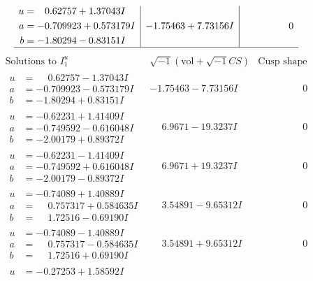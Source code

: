 \documentclass[1p]{elsarticle_modified}
\theoremstyle{definition}
\newcommand{\I}{\sqrt{-1}}
\begin{document}
$$\begin{array}{c|c|c}
\begin{aligned}
u &= \phantom{-}0.62757 + 1.37043 I \\
a &= -0.709923 + 0.573179 I \\
b &= -1.80294 - 0.83151 I\end{aligned}
 & -1.75463 + 7.73156 I & \phantom{-0.000000 } 0\\
 \hline 
 \end{array}$$\newpage$$\begin{array}{c|c|c}  
\text{Solutions to }I^u_{1}& \I (\text{vol} + \sqrt{-1}CS) & \text{Cusp shape}\\
 \hline 
\begin{aligned}
u &= \phantom{-}0.62757 - 1.37043 I \\
a &= -0.709923 - 0.573179 I \\
b &= -1.80294 + 0.83151 I\end{aligned}
 & -1.75463 - 7.73156 I & \phantom{-0.000000 } 0 \\ \hline\begin{aligned}
u &= -0.62231 + 1.41409 I \\
a &= -0.749592 - 0.616048 I \\
b &= -2.00179 + 0.89372 I\end{aligned}
 & \phantom{-}6.9671 - 19.3237 I & \phantom{-0.000000 } 0 \\ \hline\begin{aligned}
u &= -0.62231 - 1.41409 I \\
a &= -0.749592 + 0.616048 I \\
b &= -2.00179 - 0.89372 I\end{aligned}
 & \phantom{-}6.9671 + 19.3237 I & \phantom{-0.000000 } 0 \\ \hline\begin{aligned}
u &= -0.74089 + 1.40889 I \\
a &= \phantom{-}0.757317 + 0.584635 I \\
b &= \phantom{-}1.72516 - 0.69190 I\end{aligned}
 & \phantom{-}3.54891 - 9.65312 I & \phantom{-0.000000 } 0 \\ \hline\begin{aligned}
u &= -0.74089 - 1.40889 I \\
a &= \phantom{-}0.757317 - 0.584635 I \\
b &= \phantom{-}1.72516 + 0.69190 I\end{aligned}
 & \phantom{-}3.54891 + 9.65312 I & \phantom{-0.000000 } 0 \\ \hline\begin{aligned}
u &= -0.27253 + 1.58592 I \\

\end{aligned}
\end{array}$$
\end{document}

